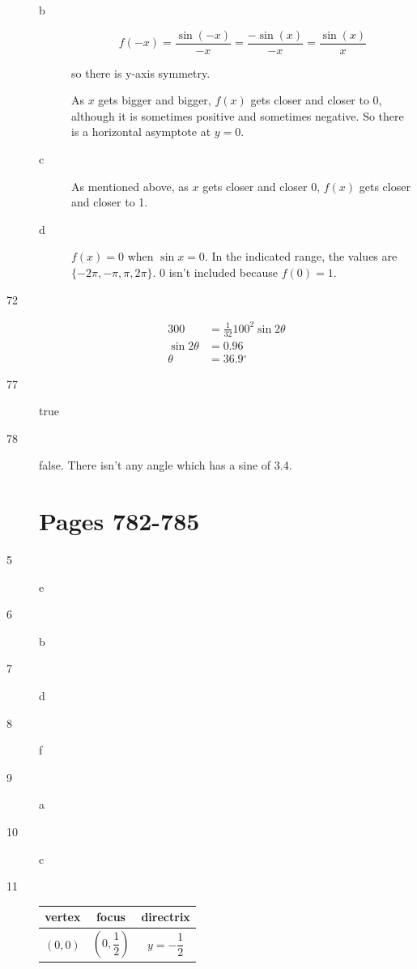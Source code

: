 \documentclass[fleqn,addpoints]{exam}
\newcommand{\degree}{\ensuremath{^\circ}}
\begin{document}
\begin{description}
\begin{description}
\item[b]
\[
  f(-x) = \frac{\sin(-x)}{-x} = \frac{-\sin(x)}{-x} = \frac{\sin(x)}{x}
\]

so there is y-axis symmetry.

As $x$ gets bigger and bigger, $f(x)$ gets closer and closer to 0, although it is sometimes positive and sometimes
negative.  So there is a horizontal asymptote at $y=0$.

\item[c]
As mentioned above, as $x$ gets closer and closer 0, $f(x)$ gets closer and closer to 1.

\item[d]
$f(x) = 0$ when $\sin x = 0$.  In the indicated range, the values are $\{-2 \pi, -\pi, \pi, 2 \pi \}$.  0 isn't included
because $f(0) = 1$.

\end{description}

\item[72]
\begin{align*}
  300 &= \frac{1}{32} 100^2 \sin 2 \theta \\
  \sin 2 \theta &= 0.96 \\
  \theta &= 36.9 \degree
\end{align*}

\item[77]
true

\item[78]
false.  There isn't any angle which has a sine of 3.4.

\section{Pages 782-785}

\item[5] e

\item[6] b

\item[7] d

\item[8] f

\item[9] a

\item[10] c

\item[11]
\begin{tabular}{ccc}
\toprule
vertex & focus & directrix \\
\midrule
  $(0, 0)$ & $\left(0, \dfrac{1}{2} \right)$ & $y = - \dfrac{1}{2}$ \\
\bottomrule
\end{tabular}


\end{description}
\end{document}
